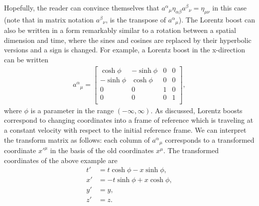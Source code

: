 \documentclass[titlepage,letterpaper,onecolumn,11pt,final]{report}
\numberwithin{equation}{section}
\numberwithin{figure}{section}
\begin{document}
Hopefully, the reader can convince themselves that ${a^{\alpha}}_{\mu} \eta_{\alpha \beta} {a^{\beta}}_{\nu} = \eta_{\mu \nu}$ in this case (note that in matrix notation ${a^{\beta}}_{\nu}$, is the transpose of ${a^{\alpha}}_{\mu}$). The Lorentz boost can also be written in a form remarkably similar to a rotation between a spatial dimension and time, where the sines and cosines are replaced by their hyperbolic versions and a sign is changed. For example, a Lorentz boost in the x-direction can be written
\begin{gather}
	\label{eq:Lorentz_boost}
	{a^{\alpha}}_{\mu} =
	\begin{bmatrix}
		\cosh \phi  & -\sinh \phi & 0 & 0 \\
		-\sinh \phi & \cosh \phi  & 0 & 0 \\
		0  						& 0             & 1 & 0 \\
		0  						& 0             & 0 & 1 \\
	\end{bmatrix}
	,
\end{gather}
%
where $\phi$ is a parameter in the range $(-\infty, \infty)$. As discussed, Lorentz boosts correspond to changing coordinates into a frame of reference which is traveling at a constant velocity with respect to the initial reference frame. We can interpret the transform matrix as follows: each column of ${a^{\alpha}}_{\mu}$ corresponds to a transformed coordinate $x'^{\mu}$ in the basis of the old coordinates $x^{\mu}$. The transformed coordinates of the above example are
\begin{subequations}
\begin{align}
	\label{eq:Lorentz_boost_t}
	t' &= t \cosh \phi - x \sinh \phi ,\\
	\label{eq:Lorentz_boost_x}
	x' &= -t \sinh \phi + x \cosh \phi ,\\
	\label{eq:Lorentz_boost_y}
	y' &= y ,\\
	\label{eq:Lorentz_boost_z}
	z' &= z .
\end{align}
\end{subequations}
\end{document}
